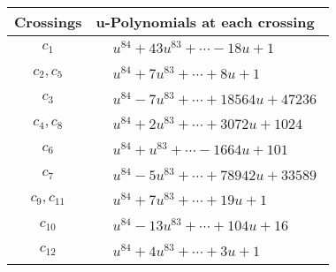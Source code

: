 \documentclass[1p]{elsarticle_modified}
\theoremstyle{definition}
\begin{document}
\begin{tabular}{m{50pt}|m{274pt}}
Crossings & \hspace{64pt}u-Polynomials at each crossing \\
\hline $$\begin{aligned}c_{1}\end{aligned}$$&$\begin{aligned}
&u^{84}+43 u^{83}+\cdots-18 u+1
\end{aligned}$\\
\hline $$\begin{aligned}c_{2},c_{5}\end{aligned}$$&$\begin{aligned}
&u^{84}+7 u^{83}+\cdots+8 u+1
\end{aligned}$\\
\hline $$\begin{aligned}c_{3}\end{aligned}$$&$\begin{aligned}
&u^{84}-7 u^{83}+\cdots+18564 u+47236
\end{aligned}$\\
\hline $$\begin{aligned}c_{4},c_{8}\end{aligned}$$&$\begin{aligned}
&u^{84}+2 u^{83}+\cdots+3072 u+1024
\end{aligned}$\\
\hline $$\begin{aligned}c_{6}\end{aligned}$$&$\begin{aligned}
&u^{84}+u^{83}+\cdots-1664 u+101
\end{aligned}$\\
\hline $$\begin{aligned}c_{7}\end{aligned}$$&$\begin{aligned}
&u^{84}-5 u^{83}+\cdots+78942 u+33589
\end{aligned}$\\
\hline $$\begin{aligned}c_{9},c_{11}\end{aligned}$$&$\begin{aligned}
&u^{84}+7 u^{83}+\cdots+19 u+1
\end{aligned}$\\
\hline $$\begin{aligned}c_{10}\end{aligned}$$&$\begin{aligned}
&u^{84}-13 u^{83}+\cdots+104 u+16
\end{aligned}$\\
\hline $$\begin{aligned}c_{12}\end{aligned}$$&$\begin{aligned}
&u^{84}+4 u^{83}+\cdots+3 u+1
\end{aligned}$\\
\hline
\end{tabular}\\~\\
\end{document}
